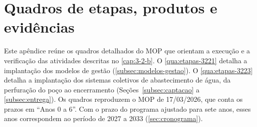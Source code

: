 \chapter{Quadros de etapas, produtos e evidências}
\label{ap:quadros}

Este apêndice reúne os quadros detalhados do MOP que orientam a execução e a
verificação das atividades descritas no \autoref{cap:3-2-b}. O
\autoref{qua:etapas-3221} detalha a implantação dos modelos de gestão
(\autoref{subsec:modelos-gestao}). O \autoref{qua:etapas-3223} detalha a
implantação dos sistemas coletivos de abastecimento de água, da perfuração do
poço ao encerramento (Seções~\ref{subsec:captacao} a \ref{subsec:entrega}).
Os quadros reproduzem o MOP de 17/03/2026, que conta os prazos em ``Anos 0
a 6''. Com o prazo do programa ajustado para sete anos, esses anos
correspondem ao período de 2027 a 2033 (\autoref{sec:cronograma}).


